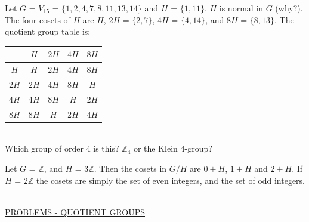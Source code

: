 \documentclass[12pt]{book}
\theoremstyle{definition}
\def\Z{\mathbb{Z}}
\begin{document}
\begin{tcexample}{}{}
 Let $G$ = $V_{15}$ = $\{1,2,4,7,8,11,13,14\}$ and $H$ =  $\{1,11\}$. $H$ is normal in $G$ (why?). The four cosets of $H$ are $H$, $2H$ = $\{2,7\}$,  $4H$ = $\{4,14\}$, and  $8H$ =   $\{8,13\}$. The quotient group table is:


\begin{center}
	\begin{tabular}{c|cccc}
		& $H$ & $2H$ & $4H$ & $8H$  \\ \hline
		$H$  & $H$ & $2H$ & $4H$ & $8H$  \\
		$2H$ & $2H$ & $4H$ & $8H$ & $H$  \\
		$4H$ & $4H$ & $8H$ & $H$ & $2H$  \\
		$8H$ & $8H$ & $H$ & $2H$ & $4H$
	\end{tabular}
\end{center}

~\\[.2in]
Which group of order 4 is this? $\Z_4$ or the Klein $4$-group?

\end{tcexample}

\begin{tcexample}{}{}
Let $G$ = $\Z$, and $H$ = $3\Z$. Then the cosets in $G/H$ are $0+H$, $1+H$ and $2+H$. If $H$ = $2\Z$ the cosets are simply the set of even integers, and the set of odd integers.
\end{tcexample}	
~\\[.2in]
\underline{PROBLEMS - QUOTIENT GROUPS}
\end{document}
